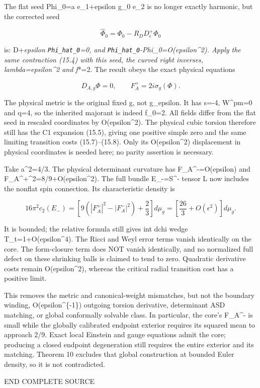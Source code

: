 \documentclass[
  10pt,
]{article}
\begin{document}
The flat seed Phi\_0=a e\_1+epsilon g\_0 e\_2 is no longer exactly
harmonic, but the corrected seed

\[
       \widehat\Phi_0=\Phi_0-R_D D_\epsilon^+\Phi_0
\]

is: D+\emph{epsilon \nolinkurl{Phi_hat_0}=0, and
\nolinkurl{Phi_hat_0}-Phi\_0=O(epsilon\^{}2). Apply the same contraction (15.4)
with this seed, the curved right inverses, lambda=epsilon\^{}2 and
f}*=2. The result obeys the exact physical equations

\[
            D_{A,g}\Phi=0,\qquad F_A^+=2i\sigma_g(\Phi).
                                                               \tag{15.10}
\]

The physical metric is the original fixed g, not g\_epsilon. It has
s=-4, W\^{}pm=0 and q=4, so the inherited majorant is indeed f\_0=2. All
fields differ from the flat seed in rescaled coordinates by
O(epsilon\^{}2). The physical cubic torsion therefore still has the C1
expansion (15.5), giving one positive simple zero and the same limiting
transition costs (15.7)--(15.8). Only its O(epsilon\^{}2) displacement
in physical coordinates is needed here; no parity assertion is
necessary.

Take a\^{}2=4/3. The physical determinant curvature has
F\_A\^{}-=O(epsilon) and
\textbar F\_A\^{}+\textbar\^{}2=8/9+O(epsilon\^{}2). The full bundle
E\_-=S\^{}- tensor L now includes the nonflat spin connection. Its
characteristic density is

\[
 16\pi^2c_2(E_-)
   =\left[9(|F_A^+|^2-|F_A^-|^2)+\frac23\right]d\mu_g
   =\left[\frac{26}{3}+O(\epsilon^2)\right]d\mu_g.
\]

It is bounded; the relative formula still gives int dchi wedge
T\_t=1+O(epsilon\^{}4). The Ricci and Weyl error terms vanish
identically on the core. The form-closure term does NOT vanish
identically, and no normalized full defect on these shrinking balls is
claimed to tend to zero. Quadratic derivative costs remain
O(epsilon\^{}2), whereas the critical radial transition cost has a
positive limit.

This removes the metric and canonical-weight mismatches, but not the
boundary winding, O(epsilon\^{}\{-1\}) outgoing torsion derivative,
determinant ASD matching, or global conformally solvable class. In
particular, the core's F\_A\^{}- is small while the globally calibrated
endpoint exterior requires its squared mean to approach 2/9. Exact local
Einstein and gauge equations admit the core; producing a closed endpoint
degeneration still requires the entire exterior and its matching.
Theorem 10 excludes that global construction at bounded Euler density,
so it is not contradicted.

END COMPLETE SOURCE
\end{document}
